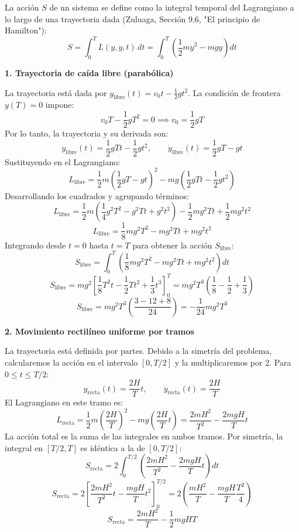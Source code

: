 \documentclass[a4paper]{article}
\begin{document}
La acción $S$ de un sistema se define como la integral temporal del Lagrangiano a lo largo de una trayectoria dada (Zuluaga, Sección 9.6, "El principio de Hamilton"):
$$S = \int_{0}^{T} L(y, \dot{y}, t) \, dt = \int_{0}^{T} \left( \frac{1}{2}m\dot{y}^2 - mgy \right) dt$$

\textbf{1. Trayectoria de caída libre (parabólica)}

La trayectoria está dada por $y_{\text{libre}}(t) = v_0t - \frac{1}{2}gt^2$. La condición de frontera $y(T) = 0$ impone:
$$v_0T - \frac{1}{2}gT^2 = 0 \implies v_0 = \frac{1}{2}gT$$
Por lo tanto, la trayectoria y su derivada son:
$$y_{\text{libre}}(t) = \frac{1}{2}gTt - \frac{1}{2}gt^2, \qquad \dot{y}_{\text{libre}}(t) = \frac{1}{2}gT - gt$$
Sustituyendo en el Lagrangiano:
$$L_{\text{libre}} = \frac{1}{2}m\left(\frac{1}{2}gT - gt\right)^2 - mg\left(\frac{1}{2}gTt - \frac{1}{2}gt^2\right)$$
Desarrollando los cuadrados y agrupando términos:
$$L_{\text{libre}} = \frac{1}{2}m\left(\frac{1}{4}g^2T^2 - g^2Tt + g^2t^2\right) - \frac{1}{2}mg^2Tt + \frac{1}{2}mg^2t^2$$
$$L_{\text{libre}} = \frac{1}{8}mg^2T^2 - mg^2Tt + mg^2t^2$$
Integrando desde $t=0$ hasta $t=T$ para obtener la acción $S_{\text{libre}}$:
$$S_{\text{libre}} = \int_{0}^{T} \left( \frac{1}{8}mg^2T^2 - mg^2Tt + mg^2t^2 \right) dt$$
$$S_{\text{libre}} = mg^2 \left[ \frac{1}{8}T^2t - \frac{1}{2}Tt^2 + \frac{1}{3}t^3 \right]_{0}^{T} = mg^2T^3 \left( \frac{1}{8} - \frac{1}{2} + \frac{1}{3} \right)$$
$$S_{\text{libre}} = mg^2T^3 \left( \frac{3 - 12 + 8}{24} \right) = -\frac{1}{24}mg^2T^3$$

\textbf{2. Movimiento rectilíneo uniforme por tramos}

La trayectoria está definida por partes. Debido a la simetría del problema, calcularemos la acción en el intervalo $[0, T/2]$ y la multiplicaremos por 2.
Para $0 \le t \le T/2$:
$$y_{\text{recta}}(t) = \frac{2H}{T}t, \qquad \dot{y}_{\text{recta}}(t) = \frac{2H}{T}$$
El Lagrangiano en este tramo es:
$$L_{\text{recta}} = \frac{1}{2}m\left(\frac{2H}{T}\right)^2 - mg\left(\frac{2H}{T}t\right) = \frac{2mH^2}{T^2} - \frac{2mgH}{T}t$$
La acción total es la suma de las integrales en ambos tramos. Por simetría, la integral en $[T/2, T]$ es idéntica a la de $[0, T/2]$:
$$S_{\text{recta}} = 2 \int_{0}^{T/2} \left( \frac{2mH^2}{T^2} - \frac{2mgH}{T}t \right) dt$$
$$S_{\text{recta}} = 2 \left[ \frac{2mH^2}{T^2}t - \frac{mgH}{T}t^2 \right]_{0}^{T/2} = 2 \left( \frac{mH^2}{T} - \frac{mgH}{T}\frac{T^2}{4} \right)$$
$$S_{\text{recta}} = \frac{2mH^2}{T} - \frac{1}{2}mgHT$$
\end{document}
